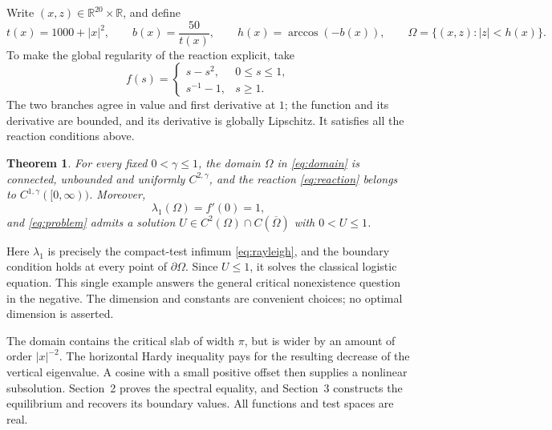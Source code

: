 \documentclass[11pt,a4paper]{article}
\newtheorem{theorem}{Theorem}[section]
\newcommand{\R}{\mathbb R}
\newcommand{\Om}{\Omega}
\begin{document}
Write $(x,z)\in\R^{20}\times\R$, and define
\begin{equation}\label{eq:domain}
 t(x)=1000+|x|^2,\qquad b(x)=\frac{50}{t(x)},\qquad
 h(x)=\arccos(-b(x)),\qquad
 \Om=\{(x,z):|z|<h(x)\}.
\end{equation}
To make the global regularity of the reaction explicit, take
\begin{equation}\label{eq:reaction}
 f(s)=\begin{cases}
 s-s^2,&0\le s\le1,\\
 s^{-1}-1,&s\ge1.
 \end{cases}
\end{equation}
The two branches agree in value and first derivative at $1$; the function
and its derivative are bounded, and its derivative is globally Lipschitz.
It satisfies all the reaction conditions above.

\begin{theorem}\label{thm:main}
For every fixed $0<\gamma\le1$, the domain $\Om$ in \eqref{eq:domain} is
connected, unbounded and uniformly $C^{2,\gamma}$, and the reaction
\eqref{eq:reaction} belongs to $C^{1,\gamma}([0,\infty))$. Moreover,
\[
 \lambda_1(\Om)=f'(0)=1,
\]
and \eqref{eq:problem} admits a solution
$U\in C^2(\Om)\cap C(\overline\Om)$ with $0<U\le1$.
\end{theorem}

Here $\lambda_1$ is precisely the compact-test infimum
\eqref{eq:rayleigh}, and the boundary condition holds at every point of
$\partial\Om$. Since $U\le1$, it solves the classical logistic equation.
This single example answers the general critical nonexistence question in
the negative. The dimension and constants are convenient choices; no optimal
dimension is asserted.

The domain contains the critical slab of width $\pi$, but is wider by an
amount of order $|x|^{-2}$. The horizontal Hardy inequality pays for the
resulting decrease of the vertical eigenvalue. A cosine with a small
positive offset then supplies a nonlinear subsolution. Section~2 proves
the spectral equality, and Section~3 constructs the equilibrium and recovers
its boundary values. All functions and test spaces are real.
\end{document}
